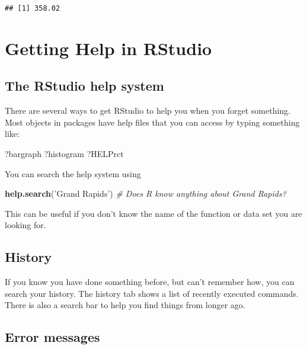 \documentclass[]{book}
\newenvironment{Shaded}{\begin{snugshade}}{\end{snugshade}}
\newcommand{\CommentTok}[1]{\textcolor[rgb]{0.56,0.35,0.01}{\textit{#1}}}
\newcommand{\KeywordTok}[1]{\textcolor[rgb]{0.13,0.29,0.53}{\textbf{#1}}}
\newcommand{\NormalTok}[1]{#1}
\newcommand{\StringTok}[1]{\textcolor[rgb]{0.31,0.60,0.02}{#1}}
\begin{document}
\begin{verbatim}
## [1] 358.02
\end{verbatim}

\hypertarget{getting-help-in-rstudio}{%
\section{Getting Help in RStudio}\label{getting-help-in-rstudio}}

\hypertarget{the-rstudio-help-system}{%
\subsection{The RStudio help system}\label{the-rstudio-help-system}}

There are several ways to get RStudio to help you when you forget something. Most objects in packages have help files that you can access by typing something like:

\begin{Shaded}
\begin{Highlighting}[]
\NormalTok{?bargraph}
\NormalTok{?histogram}
\NormalTok{?HELPrct}
\end{Highlighting}
\end{Shaded}

You can search the help system using

\begin{Shaded}
\begin{Highlighting}[]
\KeywordTok{help.search}\NormalTok{(}\StringTok{'Grand Rapids'}\NormalTok{)    }\CommentTok{# Does R know anything about Grand Rapids?}
\end{Highlighting}
\end{Shaded}

This can be useful if you don't know the name of the function or data set you are looking for.

\hypertarget{history}{%
\subsection{History}\label{history}}

If you know you have done something before, but can't remember how, you can search your history. The history tab shows a list of recently executed commands. There is also a search bar to help you find things from longer ago.

\hypertarget{error-messages}{%
\subsection{Error messages}\label{error-messages}}
\end{document}
